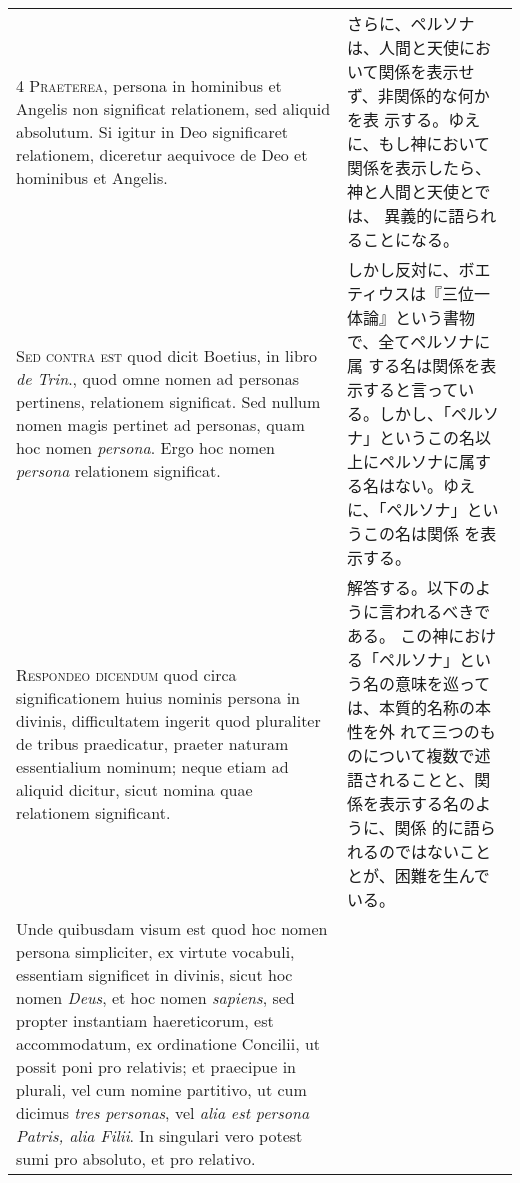 \documentclass[10pt]{jsarticle} %
\begin{document}
\begin{longtable}{p{21em}p{21em}}
4 {\scshape Praeterea}, persona in hominibus et Angelis non significat relationem,
sed aliquid absolutum. Si igitur in Deo significaret relationem,
diceretur aequivoce de Deo et hominibus et Angelis.


&

さらに、ペルソナは、人間と天使において関係を表示せず、非関係的な何かを表
 示する。ゆえに、もし神において関係を表示したら、神と人間と天使とでは、
 異義的に語られることになる。

\\



{\scshape Sed contra est} quod dicit Boetius, in libro {\itshape de Trin}., quod omne nomen ad
personas pertinens, relationem significat. Sed nullum nomen magis
pertinet ad personas, quam hoc nomen {\itshape persona}. Ergo hoc nomen {\itshape persona}
relationem significat.


&

しかし反対に、ボエティウスは『三位一体論』という書物で、全てペルソナに属
 する名は関係を表示すると言っている。しかし、「ペルソナ」というこの名以
 上にペルソナに属する名はない。ゆえに、「ペルソナ」というこの名は関係
 を表示する。


\\



{\scshape Respondeo dicendum} quod circa significationem huius nominis persona in
divinis, difficultatem ingerit quod pluraliter de tribus praedicatur,
praeter naturam essentialium nominum; neque etiam ad aliquid dicitur,
sicut nomina quae relationem significant. 


&

解答する。以下のように言われるべきである。
この神における「ペルソナ」という名の意味を巡っては、本質的名称の本性を外
れて三つのものについて複数で述語されることと、関係を表示する名のように、関係
的に語られるのではないこととが、困難を生んでいる。


\\


Unde quibusdam visum est quod
hoc nomen persona simpliciter, ex virtute vocabuli, essentiam significet
in divinis, sicut hoc nomen {\itshape Deus}, et hoc nomen {\itshape sapiens}, sed propter
instantiam haereticorum, est accommodatum, ex ordinatione Concilii, ut
possit poni pro relativis; et praecipue in plurali, vel cum nomine
partitivo, ut cum dicimus {\itshape tres personas}, vel {\itshape alia est persona Patris,
alia Filii}. 
In singulari vero potest sumi pro absoluto, et pro
relativo.


\end{longtable}
\end{document}
